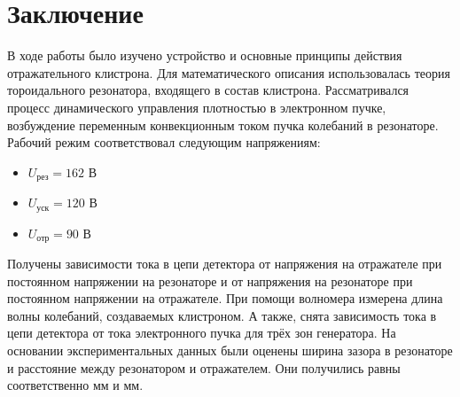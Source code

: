 \section{Заключение}
В ходе работы было изучено устройство и основные принципы действия отражательного клистрона. Для математического описания использовалась теория тороидального резонатора, входящего в состав клистрона. Рассматривался процесс динамического управления плотностью в электронном пучке, возбуждение переменным конвекционным током пучка колебаний в резонаторе. Рабочий режим соответствовал следующим напряжениям: 
\begin{itemize}
	\item $U_{\text{рез}}=162$ В
	\item $U_{\text{уск}}=120$ В
	\item $U_{\text{отр}}=90$ В
\end{itemize}

Получены зависимости тока в цепи детектора от напряжения на отражателе при постоянном напряжении на резонаторе и от напряжения на резонаторе при постоянном напряжении на отражателе. При помощи волномера измерена длина волны колебаний, создаваемых клистроном. А также, снята зависимость тока в цепи детектора от тока электронного пучка для трёх зон генератора. На основании экспериментальных данных были оценены ширина зазора в резонаторе и расстояние между резонатором и отражателем. Они получились равны соответственно  мм и  мм.

